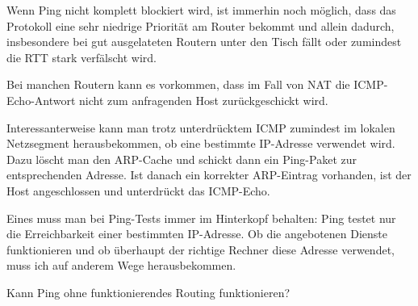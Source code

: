 \begin{normaltext}
  Wenn Ping nicht komplett blockiert wird, ist immerhin noch möglich, dass das
  Protokoll eine sehr niedrige Priorität am Router bekommt und allein dadurch,
  insbesondere bei gut ausgelateten Routern unter den Tisch fällt oder
  zumindest die RTT stark verfälscht wird.

  Bei manchen Routern kann es vorkommen, dass im Fall von NAT die
  ICMP-Echo-Antwort nicht zum anfragenden Host zurückgeschickt wird.

  Interessanterweise kann man trotz unterdrücktem ICMP zumindest im lokalen
  Netzsegment herausbekommen, ob eine bestimmte IP-Adresse verwendet wird.
  Dazu löscht man den ARP-Cache und schickt dann ein Ping-Paket zur
  entsprechenden Adresse. Ist danach ein korrekter ARP-Eintrag vorhanden, ist
  der Host angeschlossen und unterdrückt das ICMP-Echo.

  Eines muss man bei Ping-Tests immer im Hinterkopf behalten: Ping testet nur
  die Erreichbarkeit einer bestimmten IP-Adresse. Ob die angebotenen Dienste
  funktionieren und ob überhaupt der richtige Rechner diese Adresse verwendet,
  muss ich auf anderem Wege herausbekommen.
  \begin{notes}
  \item Kann Ping ohne funktionierendes Routing funktionieren?
  \end{notes}
\end{normaltext}

